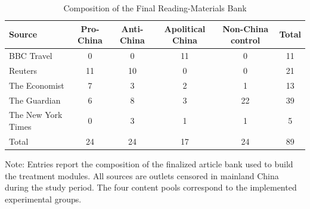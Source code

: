 \begin{table}[H]
\centering
\caption{Composition of the Final Reading-Materials Bank}
\label{tab:material_bank_summary}
\footnotesize
\begin{threeparttable}
\begin{tabular}{lccccc}
\toprule
Source & Pro-China & Anti-China & Apolitical China & Non-China control & Total \\
\midrule
BBC Travel & 0 & 0 & 11 & 0 & 11 \\
Reuters & 11 & 10 & 0 & 0 & 21 \\
The Economist & 7 & 3 & 2 & 1 & 13 \\
The Guardian & 6 & 8 & 3 & 22 & 39 \\
The New York Times & 0 & 3 & 1 & 1 & 5 \\
\midrule
Total & 24 & 24 & 17 & 24 & 89 \\
\bottomrule
\end{tabular}
\begin{tablenotes}[flushleft]
\footnotesize
\item Note: Entries report the composition of the finalized article bank used to build the treatment modules. All sources are outlets censored in mainland China during the study period. The four content pools correspond to the implemented experimental groups.
\end{tablenotes}
\end{threeparttable}
\end{table}

